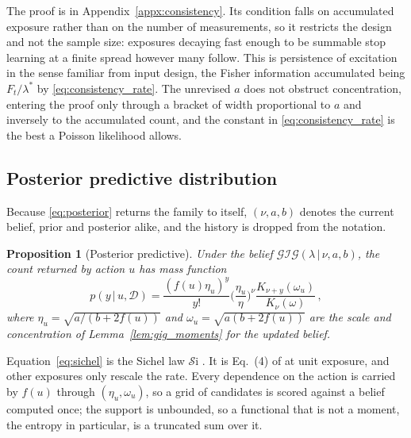 \documentclass[twoside]{article}
\newcommand\given[1][]{\,#1\vert\,}
\providecommand{\Gig}{\mathcal{GIG}}  %
\providecommand{\Sic}{\mathcal{S}\mathrm{i}}   %
\theoremstyle{plain}
\newtheorem{proposition}{Proposition}
\theoremstyle{definition}
\theoremstyle{remark}
\begin{document}
The proof is in Appendix~\ref{appx:consistency}.
Its condition falls on accumulated exposure rather than on the number of measurements, so it restricts the design and not the sample size: exposures decaying fast enough to be summable stop learning at a finite spread however many follow.
This is persistence of excitation in the sense familiar from input design, the Fisher information accumulated being $F_t/\lambda^{*}$ by \eqref{eq:consistency_rate}.
The unrevised $a$ does not obstruct concentration, entering the proof only through a bracket of width proportional to $a$ and inversely to the accumulated count, and the constant in \eqref{eq:consistency_rate} is the best a Poisson likelihood allows.

\subsection{Posterior predictive distribution}
\label{sec:inference_predictive}

Because \eqref{eq:posterior} returns the family to itself, $(\nu, a, b)$ denotes the current belief, prior and posterior alike, and the history is dropped from the notation.

\begin{proposition}[Posterior predictive]
    \label{prop:predictive}
    Under the belief $\Gig(\lambda \given \nu, a, b)$, the count returned by action $u$ has mass function
    \begin{equation}
        p(y \given u, \mathcal{D}) = \frac{(f(u) \eta_u)^{y}}{y!} \Big( \frac{\eta_u}{\eta} \Big)^{\nu} \frac{K_{\nu + y}(\omega_u)}{K_{\nu}(\omega)} \,,
        \label{eq:sichel}
    \end{equation}
    where $\eta_u = \sqrt{a / (b + 2 f(u))}$ and $\omega_u = \sqrt{a (b + 2 f(u))}$ are the scale and concentration of Lemma~\ref{lem:gig_moments} for the updated belief.
\end{proposition}

Equation~\eqref{eq:sichel} is the Sichel law $\Sic$ \citep{sichel1975distribution,stein1987parameter}.
It is Eq.~(4) of \citet{sichel1973statistical} at unit exposure, and other exposures only rescale the rate.
Every dependence on the action is carried by $f(u)$ through $(\eta_u, \omega_u)$, so a grid of candidates is scored against a belief computed once; the support is unbounded, so a functional that is not a moment, the entropy in particular, is a truncated sum over it.
\end{document}
